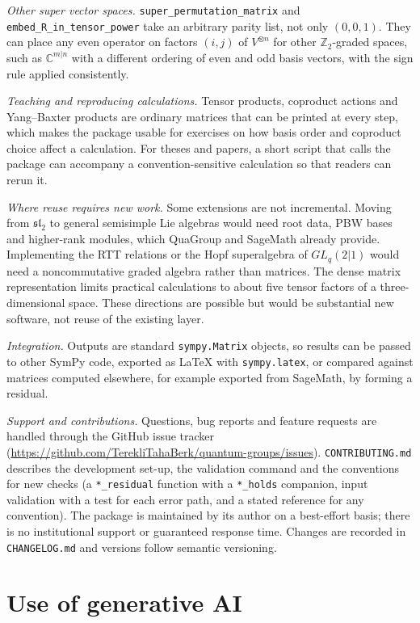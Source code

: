 \documentclass[11pt,a4paper]{article}
\newcommand{\code}[1]{\texttt{#1}}
\newcommand{\GL}{GL_q(2|1)}
\begin{document}
\emph{Other super vector spaces.} \code{super\_permutation\_matrix} and \code{embed\_R\_in\_tensor\_power} take an arbitrary parity list, not only $(0,0,1)$. They can place any even operator on factors $(i,j)$ of $V^{\otimes n}$ for other $\mathbb{Z}_2$-graded spaces, such as $\mathbb{C}^{m|n}$ with a different ordering of even and odd basis vectors, with the sign rule applied consistently.

\emph{Teaching and reproducing calculations.} Tensor products, coproduct actions and Yang--Baxter products are ordinary matrices that can be printed at every step, which makes the package usable for exercises on how basis order and coproduct choice affect a calculation. For theses and papers, a short script that calls the package can accompany a convention-sensitive calculation so that readers can rerun it.

\emph{Where reuse requires new work.} Some extensions are not incremental. Moving from $\mathfrak{sl}_2$ to general semisimple Lie algebras would need root data, PBW bases and higher-rank modules, which QuaGroup and SageMath already provide. Implementing the RTT relations or the Hopf superalgebra of $\GL$ would need a noncommutative graded algebra rather than matrices. The dense matrix representation limits practical calculations to about five tensor factors of a three-dimensional space. These directions are possible but would be substantial new software, not reuse of the existing layer.

\emph{Integration.} Outputs are standard \code{sympy.Matrix} objects, so results can be passed to other SymPy code, exported as LaTeX with \code{sympy.latex}, or compared against matrices computed elsewhere, for example exported from SageMath, by forming a residual.

\emph{Support and contributions.} Questions, bug reports and feature requests are handled through the GitHub issue tracker (\url{https://github.com/TerekliTahaBerk/quantum-groups/issues}). \code{CONTRIBUTING.md} describes the development set-up, the validation command and the conventions for new checks (a \code{*\_residual} function with a \code{*\_holds} companion, input validation with a test for each error path, and a stated reference for any convention). The package is maintained by its author on a best-effort basis; there is no institutional support or guaranteed response time. Changes are recorded in \code{CHANGELOG.md} and versions follow semantic versioning.

\section*{Use of generative AI}
\end{document}
